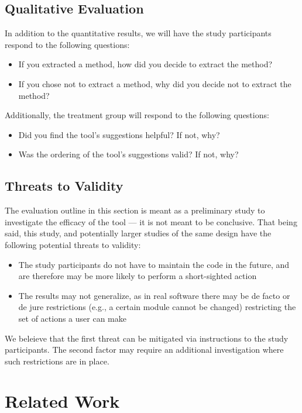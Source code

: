 \documentclass[preprint,10pt]{sigplanconf}
\begin{document}
\subsection{Qualitative Evaluation}
In addition to the quantitative results, we will have the study
participants respond to the following questions:

\begin{itemize}
  \item If you extracted a method, how did you decide to extract the
    method? 
  \item If you chose not to extract a method, why did you decide not
    to extract the method?
\end{itemize}

\noindent Additionally, the treatment group will respond to the following
questions:

\begin{itemize}
  \item Did you find the tool's suggestions helpful? If not, why?
  \item Was the ordering of the tool's suggestions valid? If not, why?
\end{itemize}

\subsection{Threats to Validity}
The evaluation outline in this section is meant as a preliminary study
to investigate the efficacy of the tool --- it is not meant to be
conclusive. That being said, this study, and potentially larger
studies of the same design have the following potential threats to
validity:

\begin{itemize}
  \item The study participants do not have to maintain the code in the
    future, and are therefore may be more likely to perform a
    short-sighted action
  \item The results may not generalize, as in real software there may
    be de facto or de jure restrictions (e.g., a certain module cannot
    be changed) restricting the set of actions a user can make
\end{itemize}

We beleieve that the first threat can be mitigated via instructions to
the study participants. The second factor may require an additional
investigation where such restrictions are in place.

\section{Related Work}
\end{document}

